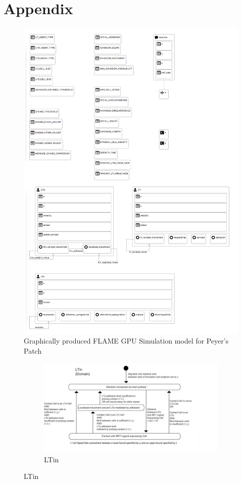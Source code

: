 \documentclass{UoYCSproject}
\begin{document}
\printbibliography
\chapter{Appendix}

\begin{figure}[htp]
\centering
\includegraphics[width=\textwidth]{Appendix/ppsim_gmf}
\caption{Graphically produced \gls{FLAME GPU} Simulation model for Peyer's Patch}
\label{fig:ppsim_gmf}
\end{figure}

\begin{figure}[htp]
\centering
\begin{subfigure}{0.95\textwidth}
\centering
\includegraphics[width=\textwidth]{Appendix/Models/Domain/LTin}
\caption{LTin}
\end{subfigure}
\end{figure}
\end{document}
